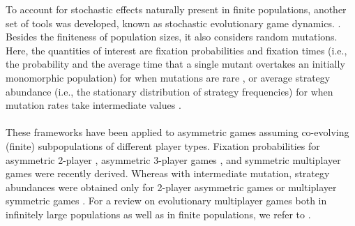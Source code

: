 \documentclass[11pt]{article}
\theoremstyle{plainCl1}
\theoremstyle{plainCl2}
\begin{document}
\noindent To account for stochastic effects naturally present in finite populations, another set of tools was developed, known as stochastic evolutionary game dynamics.  \cite{Nowak:Nature:2004, Traulsen:bookchapter:2009}. Besides the finiteness of population sizes, it also considers random mutations. Here, the quantities of interest are fixation probabilities and fixation times (i.e., the probability and the average time that a single mutant overtakes an initially monomorphic population) for when mutations are rare \cite{Fudenberg:TPB:2006}, or average strategy abundance (i.e., the stationary distribution of strategy frequencies) for when mutation rates take intermediate values \cite{antal:JTB:2009a, antal:JTB:2009b}. 
\\ \\
\noindent 
These frameworks have been applied to asymmetric games assuming co-evolving (finite) subpopulations of different player types. Fixation probabilities for asymmetric 2-player \cite{Sekiguchi:DGA:2017}, asymmetric 3-player games \cite{Sekiguchi:DGAA:2022}, and symmetric multiplayer games \cite{Kurokawa:PRSB:2009, gokhale:PNAS:2010} were recently derived. Whereas with intermediate mutation, strategy abundances were obtained only for 2-player asymmetric games \cite{Ohtsuki:JTB:2010, Sekiguchi:PA:2013} or multiplayer symmetric games \cite{gokhale:JTB:2011, Wu:Games:2013}. For a review on evolutionary multiplayer games both in infinitely large populations as well as in finite populations, we refer to \cite{Gokhale:DGAA:2014}.\\ 

\end{document}
